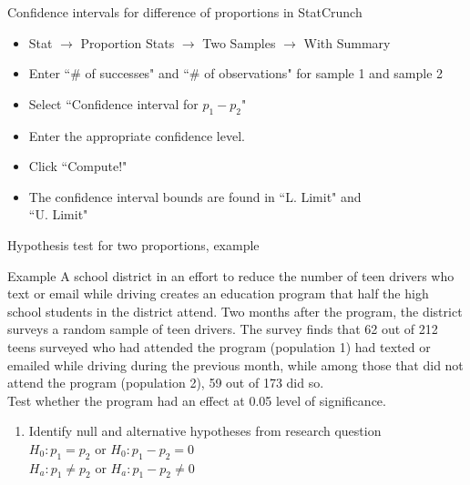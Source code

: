 \documentclass[xcolor=table]{beamer}
\begin{document}
\begin{frame}{Confidence intervals for difference of proportions in StatCrunch}

\begin{block}{}
\begin{itemize}
\item Stat $\to$ Proportion Stats $\to$ Two Samples $\to$ With Summary
\item Enter ``\# of successes" and ``\# of observations" for sample 1 and sample 2
\item Select ``Confidence interval for $p_1 - p_2$"
\item Enter the appropriate confidence level.
\item Click ``Compute!"
\item The confidence interval bounds are found in ``L. Limit" and\\ ``U. Limit"
\end{itemize}
\end{block}

\end{frame}

\begin{frame}{Hypothesis test for two proportions, example}
\begin{exampleblock}{Example}
\large
A school district in an effort to reduce the number of teen drivers who text or email while driving creates an education program that half the high school students in the district attend. Two months after the program, the district surveys a random sample of teen drivers. The survey finds that 62 out of 212 teens surveyed who had attended the program (population 1) had texted or emailed while driving during the previous month, while among those that did not attend the program (population 2), 59 out of 173 did so.\\
\medskip
Test whether the program had an effect at 0.05 level of significance.
\begin{enumerate}
\pause\item Identify null and alternative hypotheses from research question\\
\pause$H_0: p_1 = p_2$ or $H_0: p_1 - p_2 = 0$\\
$H_a: p_1 \ne p_2$ or $H_a: p_1 - p_2 \ne 0$\\
\end{enumerate}
\end{exampleblock}
\end{frame}
\end{document}
